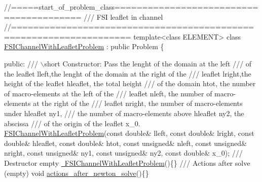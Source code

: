  
\begin{DoxyCodeInclude}
\textcolor{comment}{//=====start\_of\_problem\_class========================================}
\textcolor{comment}{/// FSI leaflet in channel}
\textcolor{comment}{}\textcolor{comment}{//===================================================================}
\textcolor{keyword}{template}<\textcolor{keyword}{class} ELEMENT>
\textcolor{keyword}{class }\hyperlink{classFSIChannelWithLeafletProblem}{FSIChannelWithLeafletProblem} : \textcolor{keyword}{public} Problem
\{

\textcolor{keyword}{public}:
\textcolor{comment}{}
\textcolor{comment}{ /// \(\backslash\)short Constructor: Pass the lenght of the domain at the left}
\textcolor{comment}{ /// of the leaflet lleft,the lenght of the domain at the right of the}
\textcolor{comment}{ /// leaflet lright,the height of the leaflet hleaflet, the total height}
\textcolor{comment}{ /// of the domain htot, the number of macro-elements at the left of the}
\textcolor{comment}{ /// leaflet nleft, the number of macro-elements at the right of the}
\textcolor{comment}{ /// leaflet nright, the number of macro-elements under hleaflet ny1,}
\textcolor{comment}{ /// the number of macro-elements above hleaflet ny2, the abscissa}
\textcolor{comment}{ /// of the origin of the leaflet x\_0.}
\textcolor{comment}{} \hyperlink{classFSIChannelWithLeafletProblem_aaa0a455e91c4fb2dd9696607b802d01b}{FSIChannelWithLeafletProblem}(\textcolor{keyword}{const} \textcolor{keywordtype}{double}& lleft,
                              \textcolor{keyword}{const} \textcolor{keywordtype}{double}& lright, \textcolor{keyword}{const} \textcolor{keywordtype}{double}& hleaflet,
                              \textcolor{keyword}{const} \textcolor{keywordtype}{double}& htot,
                              \textcolor{keyword}{const} \textcolor{keywordtype}{unsigned}& nleft, \textcolor{keyword}{const} \textcolor{keywordtype}{unsigned}& nright,
                              \textcolor{keyword}{const} \textcolor{keywordtype}{unsigned}& ny1, \textcolor{keyword}{const} \textcolor{keywordtype}{unsigned}&  ny2,
                              \textcolor{keyword}{const} \textcolor{keywordtype}{double}& x\_0);  
\textcolor{comment}{}
\textcolor{comment}{ /// Destructor empty}
\textcolor{comment}{} \hyperlink{classFSIChannelWithLeafletProblem_a5df1d8f7229314a92ffb48ec61f56fe0}{~FSIChannelWithLeafletProblem}()\{\}
 \textcolor{comment}{}
\textcolor{comment}{ /// Actions after solve (empty)}
\textcolor{comment}{} \textcolor{keywordtype}{void} \hyperlink{classFSIChannelWithLeafletProblem_abff6e46a940263c9255a61f649bb4239}{actions\_after\_newton\_solve}()\{\}

\end{DoxyCodeInclude}
